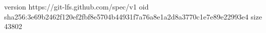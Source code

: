 version https://git-lfs.github.com/spec/v1
oid sha256:3e69b2462f120ef2fbf8e5704b44931f7a76a8e1a2d8a3770c1e7e89e22993e4
size 43802
